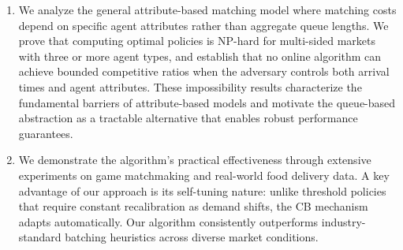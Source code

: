 \begin{enumerate}
    \item %
    We analyze the general attribute-based matching model where matching costs depend on specific agent attributes rather than aggregate queue lengths.
    We prove that computing optimal policies is NP-hard for multi-sided markets with three or more agent types, and establish that no online algorithm can achieve bounded competitive ratios when the adversary controls both arrival times and agent attributes.
    These impossibility results characterize the fundamental barriers of attribute-based models and motivate the queue-based abstraction as a tractable alternative that enables robust performance guarantees.

    \item %
    We demonstrate the algorithm's practical effectiveness through extensive experiments on game matchmaking and real-world food delivery data.
    A key advantage of our approach is its self-tuning nature: unlike threshold policies that require constant recalibration as demand shifts, the CB mechanism adapts automatically.
    Our algorithm consistently outperforms industry-standard batching heuristics across diverse market conditions.
\end{enumerate}

